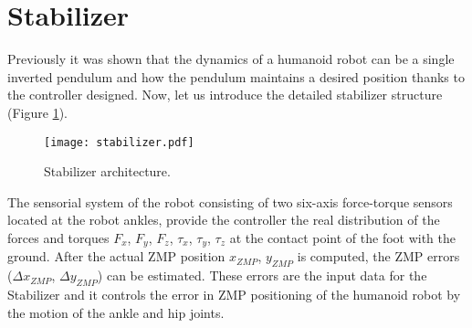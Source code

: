\section{Stabilizer}
Previously it was shown that the dynamics of a humanoid robot can be a single inverted pendulum and how the pendulum maintains a desired position thanks to the controller designed. Now, let us introduce the detailed stabilizer structure (Figure \ref{fig:stabilizer}).

\begin{figure}[!h]
\centering
\texttt{[image: stabilizer.pdf]}
\caption{Stabilizer architecture.}
\label{fig:stabilizer}
\end{figure}

The sensorial system of the robot consisting of two six-axis force-torque sensors located at the robot ankles, provide the controller the real distribution of the forces and torques $F_x$, $F_y$, $F_z$, $\tau_x$, $\tau_y$, $\tau_z$ at the contact point of the foot with the ground. After the actual ZMP position $x_{ZMP}$, $y_{ZMP}$ is computed, the ZMP errors ($\Delta x_{ZMP}$, $\Delta y_{ZMP}$) can be estimated. These errors are the input data for the Stabilizer and it controls the error in ZMP positioning of the humanoid robot by the motion of the ankle and hip joints.

